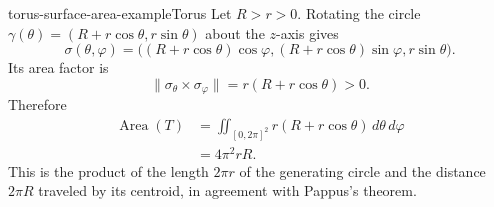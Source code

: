 \documentclass[preview]{standalone}
\begin{document}
\begin{snippetexample}{torus-surface-area-example}{Torus}
    Let \(R>r>0\). Rotating the circle
    \(\gamma(\theta)=(R+r\cos\theta,r\sin\theta)\) about the \(z\)-axis
    gives
    \[
        \sigma(\theta,\varphi)=
        \bigl((R+r\cos\theta)\cos\varphi,
              (R+r\cos\theta)\sin\varphi,
              r\sin\theta\bigr).
    \]
    Its area factor is
    \[
        \|\sigma_\theta\times\sigma_\varphi\|
        =r(R+r\cos\theta)>0.
    \]
    Therefore
    \begin{align*}
        \operatorname{Area}(T)
        &=\iint_{[0,2\pi]^2}r(R+r\cos\theta)
            \,d\theta\,d\varphi\\
        &=4\pi^2rR.
    \end{align*}
    This is the product of the length \(2\pi r\) of the generating circle
    and the distance \(2\pi R\) traveled by its centroid, in agreement with
    Pappus's theorem.
\end{snippetexample}
\end{document}
